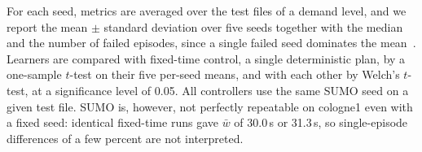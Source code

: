 For each seed, metrics are averaged over the test files of a demand level, and we report the mean $\pm$ standard deviation over five seeds together with the median and the number of failed episodes, since a single failed seed dominates the mean~\cite{agarwal2021precipice}. Learners are compared with fixed-time control, a single deterministic plan, by a one-sample $t$-test on their five per-seed means, and with each other by Welch's $t$-test, at a significance level of 0.05. All controllers use the same SUMO seed on a given test file. SUMO is, however, not perfectly repeatable on cologne1 even with a fixed seed: identical fixed-time runs gave $\bar{w}$ of 30.0\,s or 31.3\,s, so single-episode differences of a few percent are not interpreted.
